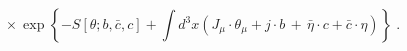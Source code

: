 \begin{equation}\label{eq:defztheta}
\times \,\exp \left\{- S[\theta;b, {\bar c}, c] + 
\int d^3x ( J_\mu \cdot \theta_\mu +  j \cdot b \,+\,
{\bar\eta}\cdot c + {\bar c} \cdot \eta  ) \right\} \;.
\end{equation}

